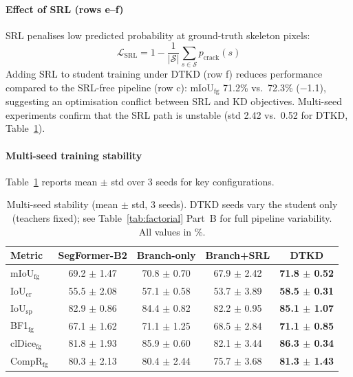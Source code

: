 \documentclass[review,authoryear]{elsarticle}
\begin{document}
\paragraph{Effect of SRL (rows e--f)}
\label{sec:srl}
SRL \citep{kirchhoff2024skeleton} penalises low predicted probability at ground-truth skeleton pixels:
\begin{equation}
    \mathcal{L}_{\text{SRL}} = 1 - \frac{1}{|\mathcal{S}|} \sum_{s \in \mathcal{S}} p_{\text{crack}}(s)
    \label{eq:srl}
\end{equation}
Adding SRL to student training under DTKD (row f) reduces performance compared to the SRL-free pipeline (row c): mIoU$_{\text{fg}}$ 71.2\% vs.\ 72.3\% ($-$1.1), suggesting an optimisation conflict between SRL and KD objectives. Multi-seed experiments confirm that the SRL path is unstable (std 2.42 vs.\ 0.52 for DTKD, Table~\ref{tab:multiseed}).

\paragraph{Multi-seed training stability}
Table~\ref{tab:multiseed} reports mean $\pm$ std over 3 seeds for key configurations.

\begin{table}[t]
\centering
\caption{Multi-seed stability (mean $\pm$ std, 3 seeds). DTKD seeds vary the student only (teachers fixed); see Table~\ref{tab:factorial} Part~B for full pipeline variability. All values in \%.}
\label{tab:multiseed}
\begin{tabular}{lcccc}
\toprule
Metric & SegFormer-B2 & Branch-only & Branch+SRL & DTKD \\
\midrule
mIoU$_{\text{fg}}$    & 69.2 $\pm$ 1.47 & 70.8 $\pm$ 0.70 & 67.9 $\pm$ 2.42 & \textbf{71.8 $\pm$ 0.52} \\
IoU$_{\text{cr}}$     & 55.5 $\pm$ 2.08 & 57.1 $\pm$ 0.58 & 53.7 $\pm$ 3.89 & \textbf{58.5 $\pm$ 0.31} \\
IoU$_{\text{sp}}$     & 82.9 $\pm$ 0.86 & 84.4 $\pm$ 0.82 & 82.2 $\pm$ 0.95 & \textbf{85.1 $\pm$ 1.07} \\
BF1$_{\text{fg}}$     & 67.1 $\pm$ 1.62 & 71.1 $\pm$ 1.25 & 68.5 $\pm$ 2.84 & \textbf{71.1 $\pm$ 0.85} \\
clDice$_{\text{fg}}$  & 81.8 $\pm$ 1.93 & 85.9 $\pm$ 0.60 & 82.1 $\pm$ 3.44 & \textbf{86.3 $\pm$ 0.34} \\
CompR$_{\text{fg}}$   & 80.3 $\pm$ 2.13 & 80.4 $\pm$ 2.44 & 75.7 $\pm$ 3.68 & \textbf{81.3 $\pm$ 1.43} \\
\bottomrule
\end{tabular}
\end{table}
\end{document}
